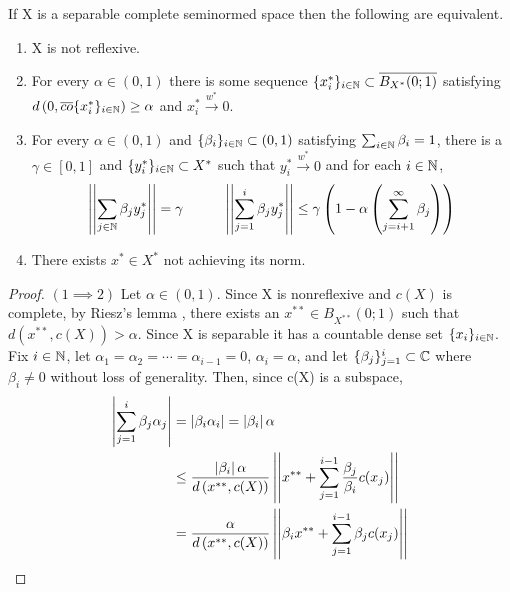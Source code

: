 \begin{thm}
    \label{thm:jamesseparable}
    If X is a separable complete seminormed space then the following are equivalent. 
    \begin{enumerate}
        \item X is not reflexive. 
        \item For every $\alpha \in (0,1)$ there is  some sequence $\{x_i^*\}_{i \in \N} \subset \overline{B_{X^*}(0;1)}$ satisfying $d\pa{0,\overline{co}\{x_i^*\}_{i \in \N}} \geq \alpha$ and $x_i^* \overset{w^*}{\to} 0$. 
        \item For every $\alpha \in (0,1)$ and $\{\beta_i\}_{i \in \N} \subset (0,1)$ satisfying $\sum_{i \in \N} \beta_i = 1$, there is a $\gamma \in [0,1]$ and $\{y_i^*\}_{i \in \N} \subset X^*$ such that $y_i^* \overset{w^*}{\to} 0$ and for each $i \in \N$, 
        \begin{equation}
            \norm{\sum_{j \in \N} \beta_j y_j^*} = \gamma \tab[1cm] \norm{\sum_{j=1}^i \beta_j y_j^*} \leq \gamma \pa{ 1- \alpha \pa{ \sum_{j=i+1}^{\infty} \beta_j}}
        \end{equation}
        \item There exists $x^* \in X^*$ not achieving its norm. 
    \end{enumerate} 
    \begin{proof} $(1 \implies 2)$
        Let $\alpha \in (0,1)$. Since X is nonreflexive and $c(X)$ is complete, by Riesz's lemma \cite{kreyszig89},  there exists an $x^{**} \in B_{X^{**}}(0;1)$ such that $d(x^{**},c(X)) > \alpha$. 
        Since X is separable it has a countable dense set $\{x_i\}_{i \in \N}$. 
        Fix $i \in \N$, let $\alpha_1=\alpha_2=\cdots=\alpha_{i-1}=0$, $\alpha_i=\alpha$, and let $\{\beta_j\}_{j=1}^i \subset \C$ where $\beta_i \neq 0$ without loss of generality. Then, since c(X) is a subspace,  
        \begin{equation}
            \begin{split}
                \abs{\sum_{j=1}^i \beta_j \alpha_j}&= \abs{\beta_i \alpha_i} = \abs{\beta_i} \alpha \\
                & \leq \frac{\abs{\beta_i} \alpha}{d\pa{x^{**},c(X)}} \norm{x^{**}+ \sum_{j=1}^{i-1} \frac{\beta_j}{\beta_i}c(x_j)}\\
                & = \frac{\alpha}{d\pa{x^{**},c(X)}} \norm{\beta_i x^{**} + \sum_{j=1}^{i-1} \beta_j c(x_j)}
            \end{split}
        \end{equation}

\end{proof}
\end{thm}
